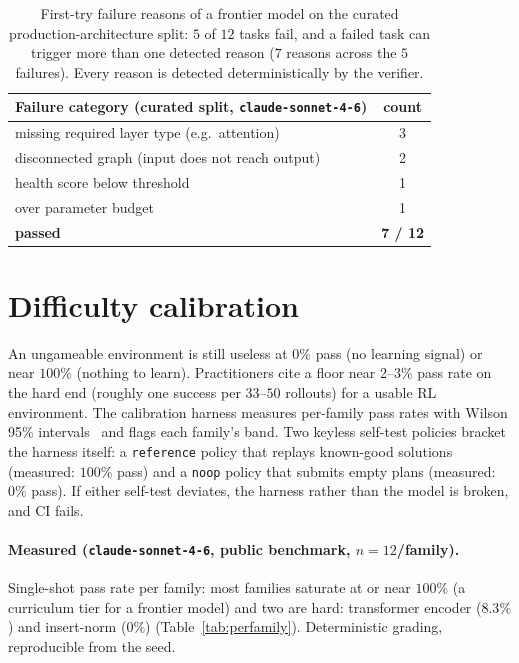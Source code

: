 \documentclass[11pt]{article}
\begin{document}
\begin{table}[t]
\centering
\small
\begin{tabular}{lc}
\toprule
Failure category (curated split, \texttt{claude-sonnet-4-6}) & count \\
\midrule
missing required layer type (e.g.\ attention) & 3 \\
disconnected graph (input does not reach output) & 2 \\
health score below threshold & 1 \\
over parameter budget & 1 \\
\midrule
\textbf{passed} & \textbf{7 / 12} \\
\bottomrule
\end{tabular}
\caption{First-try failure reasons of a frontier model on the curated production-architecture split: $5$ of $12$ tasks fail, and a failed task can trigger more than one detected reason ($7$ reasons across the $5$ failures). Every reason is detected deterministically by the verifier.}
\label{tab:curated}
\end{table}

\section{Difficulty calibration}
\label{sec:calib}
An ungameable environment is still useless at $0\%$ pass (no learning signal) or near $100\%$ (nothing to learn). Practitioners cite a floor near 2--3\% pass rate on the hard end (roughly one success per $33$--$50$ rollouts) for a usable RL environment. The calibration harness measures per-family pass rates with Wilson 95\% intervals~\cite{wilson} and flags each family's band. Two keyless self-test policies bracket the harness itself: a \texttt{reference} policy that replays known-good solutions (measured: $100\%$ pass) and a \texttt{noop} policy that submits empty plans (measured: $0\%$ pass). If either self-test deviates, the harness rather than the model is broken, and CI fails.

\paragraph{Measured (\texttt{claude-sonnet-4-6}, public benchmark, $n=12$/family).} Single-shot pass rate per family: most families saturate at or near $100\%$ (a curriculum tier for a frontier model) and two are hard: transformer encoder ($8.3\%$) and insert-norm ($0\%$) (Table~\ref{tab:perfamily}). Deterministic grading, reproducible from the seed.
\end{document}
